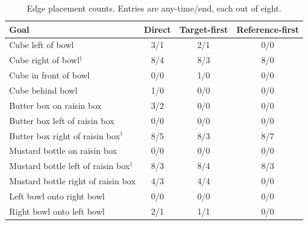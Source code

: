 \documentclass{article}
\begin{document}
\begin{table}[htbp]\centering\small
\caption{Edge placement counts. Entries are any-time/end, each out of eight.}
\begin{tabular}{@{}p{.48\linewidth}ccc@{}}\toprule Goal & Direct & Target-first & Reference-first\\\midrule

Cube left of bowl & 3/1 & 2/1 & 0/0\\

Cube right of bowl$^\dagger$ & 8/4 & 8/3 & 8/0\\

Cube in front of bowl & 0/0 & 1/0 & 0/0\\

Cube behind bowl & 1/0 & 0/0 & 0/0\\

Butter box on raisin box & 3/2 & 0/0 & 0/0\\

Butter box left of raisin box & 0/0 & 0/0 & 0/0\\

Butter box right of raisin box$^\dagger$ & 8/5 & 8/3 & 8/7\\

Mustard bottle on raisin box & 0/0 & 0/0 & 0/0\\

Mustard bottle left of raisin box$^\dagger$ & 8/3 & 8/4 & 8/3\\

Mustard bottle right of raisin box & 4/3 & 4/4 & 0/0\\

Left bowl onto right bowl & 0/0 & 0/0 & 0/0\\

Right bowl onto left bowl & 2/1 & 1/1 & 0/0\\

\bottomrule\end{tabular}\end{table}
\end{document}
